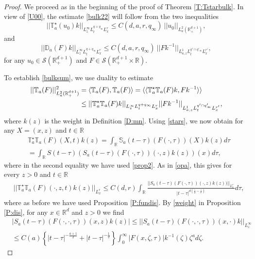 \documentclass[11pt,letter]{amsart}
\def \RN {\mathbb{R}_+^{d+1}}
\def \R {\mathbb{R}}
\newcommand{\Rd}{\mathbb R^d}
\numberwithin{equation}{section}
\newcommand{\sa}{\langle}
\newcommand{\da}{\rangle}
\numberwithin{equation}{section}
\begin{document}
\begin{proof}
We proceed as in the beginning of the proof of Theorem \ref{T:Tstarbulk}. In view of \eqref{U00}, the estimate \eqref{bulk22} will follow from the two inequalities
\begin{equation}\label{bulksum}
||\mathbb T^\star_a(u_0)k||_{L^\infty_z L^{q+q_\infty}_t L^r_x } \le C(d,a,r,q_\infty)\ ||u_0||_{L^2_a(\RN)},
\end{equation}
and 
\begin{equation}\label{crucial}
||\mathbb D_a(F) k||_{L^\infty_z L^{q+q_\infty}_t L^r_x} \le C(d,a,r,q_\infty)\  ||F k^{-1}||_{L^1_{a,z} L^{q'\cap q'_\infty}_t L^{r'}_x},
\end{equation}
for any $u_0\in \mathscr S(\RN)$ and $F\in \mathscr S(\RN\times \R)$.

To establish \eqref{bulksum}, we use duality  to estimate
\begin{align}\label{popo}
||\mathbb T_a(F)||^2_{L_a^2(\RN)} & = \sa \mathbb T_a(F),\mathbb T_a(F)\da = \sa\sa \mathbb T_a^\star \mathbb T_a(F) k,F k^{-1}\da\da
\\
&  \le ||\mathbb T_a^\star \mathbb T_a(F) k||_{L^\infty_z L^{q+q_\infty}_t L^r_x } ||F k^{-1}||_{L^1_{a,z} L^{q' \cap q'_\infty}_t L^{r'}_x },
\notag
\end{align}
where $k(z)$ is the weight in Definition \ref{D:mn}. Using \eqref{stars}, we now obtain for any $X = (x,z)$ and $t\in \R$
\begin{align*}
& \mathbb T_a^\star \mathbb T_a(F)(X,t) k(z)  = \int_\R \mathbb S_a(t-\tau)(F(\cdot,\tau))(X) k(z) d\tau
\\
& = \int_\R S(t-\tau)(S_a(t-\tau)(F(\cdot,\tau))(\cdot,z) k(z))(x) d\tau,
\end{align*}
where in the second equality we have used \eqref{prop2}. As in \eqref{opa}, this gives for every $z>0$ and $t\in \R$
\begin{align}\label{opa7}
& ||\mathbb T_a^\star \mathbb T_a(F)(\cdot,z,t) k(z)||_{L^r_x} \le C(d,r) \int_\R \frac{||S_a(t-\tau)(F(\cdot,\tau))(\cdot,z) k(z))||_{L^{r'}_x}}{|t-\tau|^{d(\frac 12 - \frac 1r)}} d\tau,
\end{align}
where as before we have used Proposition \ref{P:fundis}.
By \eqref{weight} in Proposition \ref{P:dis}, for any $x\in \Rd$ and $z>0$ we find 
\begin{align*}
& |S_a(t-\tau)(F(\cdot,\cdot,\tau))(x,z) k(z)|\le ||S_a(t-\tau)(F(\cdot,\cdot,\tau))(x,\cdot) k||_{L^\infty_z}
\\
& \le C(a)\left\{|t-\tau|^{-\frac{a+1}2} + |t-\tau|^{-\frac{1}2}\right\} \int_0^\infty |F(x,\zeta,\tau)| k^{-1}(\zeta) \zeta^a d\zeta.

\end{align*}
\end{proof}
\end{document}
